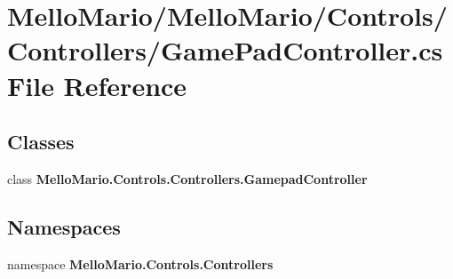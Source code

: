 \section{Mello\+Mario/\+Mello\+Mario/\+Controls/\+Controllers/\+Game\+Pad\+Controller.cs File Reference}
\label{GamePadController_8cs}
\subsection*{Classes}
\begin{DoxyCompactItemize}
\item 
class \textbf{ Mello\+Mario.\+Controls.\+Controllers.\+Gamepad\+Controller}
\end{DoxyCompactItemize}
\subsection*{Namespaces}
\begin{DoxyCompactItemize}
\item 
namespace \textbf{ Mello\+Mario.\+Controls.\+Controllers}
\end{DoxyCompactItemize}
